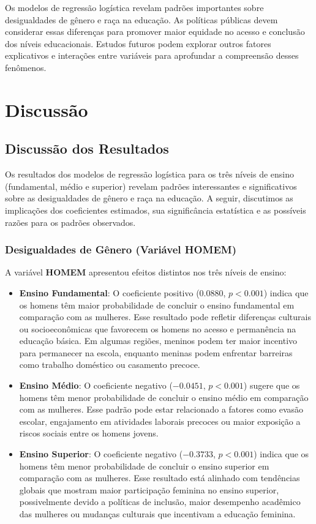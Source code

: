 \documentclass[a4paper,12pt]{article}
\begin{document}
Os modelos de regressão logística revelam padrões importantes sobre desigualdades de gênero e raça na educação. As políticas públicas devem considerar essas diferenças para promover maior equidade no acesso e conclusão dos níveis educacionais. Estudos futuros podem explorar outros fatores explicativos e interações entre variáveis para aprofundar a compreensão desses fenômenos.


\section{Discussão}

\subsection{Discussão dos Resultados}

Os resultados dos modelos de regressão logística para os três níveis de ensino (fundamental, médio e superior) revelam padrões interessantes e significativos sobre as desigualdades de gênero e raça na educação. A seguir, discutimos as implicações dos coeficientes estimados, sua significância estatística e as possíveis razões para os padrões observados.

\subsubsection{Desigualdades de Gênero (Variável HOMEM)}

A variável \textbf{HOMEM} apresentou efeitos distintos nos três níveis de ensino:

\begin{itemize}
    \item \textbf{Ensino Fundamental}: O coeficiente positivo (\(0.0880\), \(p < 0.001\)) indica que os homens têm maior probabilidade de concluir o ensino fundamental em comparação com as mulheres. Esse resultado pode refletir diferenças culturais ou socioeconômicas que favorecem os homens no acesso e permanência na educação básica. Em algumas regiões, meninos podem ter maior incentivo para permanecer na escola, enquanto meninas podem enfrentar barreiras como trabalho doméstico ou casamento precoce.
    
    \item \textbf{Ensino Médio}: O coeficiente negativo (\(-0.0451\), \(p < 0.001\)) sugere que os homens têm menor probabilidade de concluir o ensino médio em comparação com as mulheres. Esse padrão pode estar relacionado a fatores como evasão escolar, engajamento em atividades laborais precoces ou maior exposição a riscos sociais entre os homens jovens.
    
    \item \textbf{Ensino Superior}: O coeficiente negativo (\(-0.3733\), \(p < 0.001\)) indica que os homens têm menor probabilidade de concluir o ensino superior em comparação com as mulheres. Esse resultado está alinhado com tendências globais que mostram maior participação feminina no ensino superior, possivelmente devido a políticas de inclusão, maior desempenho acadêmico das mulheres ou mudanças culturais que incentivam a educação feminina.
\end{itemize}
\end{document}
